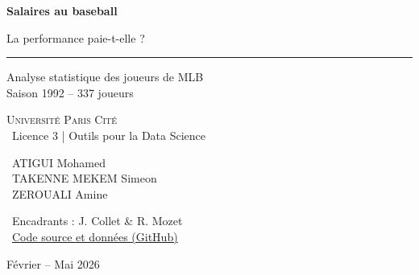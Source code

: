 \documentclass[11pt,a4paper]{article}
\begin{document}
\begin{titlepage}
\centering

\vspace*{2cm}

{\Huge\bfseries\color{main}
Salaires au baseball
}

\vspace{0.4cm}

{\Large La performance paie-t-elle ?}

\vspace{1cm}

\rule{0.4\linewidth}{1pt}

\vspace{1.5cm}

{\large
Analyse statistique des joueurs de MLB\\
Saison 1992 -- 337 joueurs
}

\vspace{2cm}

{\large
\textcolor{main}{\faUniversity} \textsc{Université Paris Cité} \\
\vspace{0.2cm}
\normalsize{\faGraduationCap\ Licence 3 | Outils pour la Data Science}
}

\vspace{1.5cm}

{\normalsize
\faUser\ ATIGUI Mohamed\\
\faUser\ TAKENNE MEKEM Simeon\\
\faUser\ ZEROUALI Amine
}

\vspace{0.8cm}

\faChalkboardTeacher\ Encadrants : J. Collet \& R. Mozet\\
\vspace{0.3cm}
\faGithub\ \href{https://github.com/Amine-Zerouali/mlb-baseball-salary-analysis}{\color{accent}Code source et données (GitHub)}

\vfill

{\small Février -- Mai 2026}

\end{titlepage}

\enlargethispage{2\baselineskip}
\tableofcontents
\newpage

\titlespacing*{\section}{0pt}{2.5ex}{1.5ex}
\titlespacing*{\subsection}{0pt}{2ex}{1ex}
\end{document}
